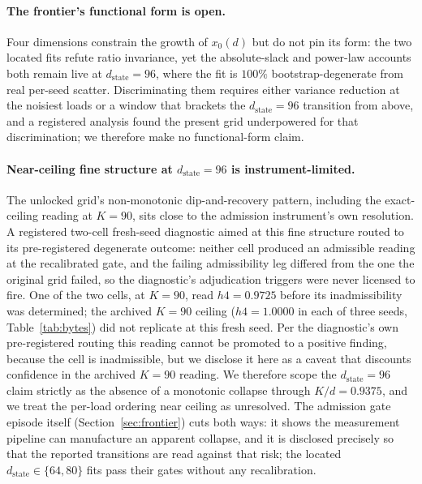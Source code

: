 \paragraph{The frontier's functional form is open.} Four dimensions
constrain the growth of $x_0(d)$ but do not pin its form: the two located
fits refute ratio invariance, yet the absolute-slack and power-law
accounts both remain live at $d_{\mathrm{state}}=96$, where the fit is
$100\%$ bootstrap-degenerate from real per-seed scatter. %
Discriminating them requires either variance reduction at the noisiest
loads or a window that brackets the $d_{\mathrm{state}}=96$ transition
from above, and a registered analysis found the present grid underpowered
for that discrimination; we therefore make no functional-form claim.

\paragraph{Near-ceiling fine structure at $d_{\mathrm{state}}=96$ is
instrument-limited.} The unlocked grid's non-monotonic dip-and-recovery
pattern, including the exact-ceiling reading at $K{=}90$, sits close to
the admission instrument's own resolution. A registered two-cell
fresh-seed diagnostic aimed at this fine structure routed to its
pre-registered degenerate outcome: neither cell produced an admissible
reading at the recalibrated gate, and the failing admissibility leg
differed from the one the original grid failed, so the diagnostic's
adjudication triggers were never licensed to fire. %
One of the two cells, at $K{=}90$, read $h4 = 0.9725$ before its
inadmissibility was determined; the archived $K{=}90$ ceiling
($h4 = 1.0000$ in each of three seeds, Table~\ref{tab:bytes}) did not
replicate at this fresh seed. %
Per the diagnostic's own pre-registered routing this reading cannot be
promoted to a positive finding, because the cell is inadmissible, but we
disclose it here as a caveat that discounts confidence in the archived
$K{=}90$ reading.
We therefore scope the $d_{\mathrm{state}}=96$ claim strictly as the
absence of a monotonic collapse through $K/d = 0.9375$, and we treat the
per-load ordering near ceiling as unresolved. The admission gate episode
itself (Section~\ref{sec:frontier}) cuts both ways: it shows the
measurement pipeline can manufacture an apparent collapse, and it is
disclosed precisely so that the reported transitions are read against
that risk; the located $d_{\mathrm{state}} \in \{64, 80\}$ fits pass
their gates without any recalibration.

